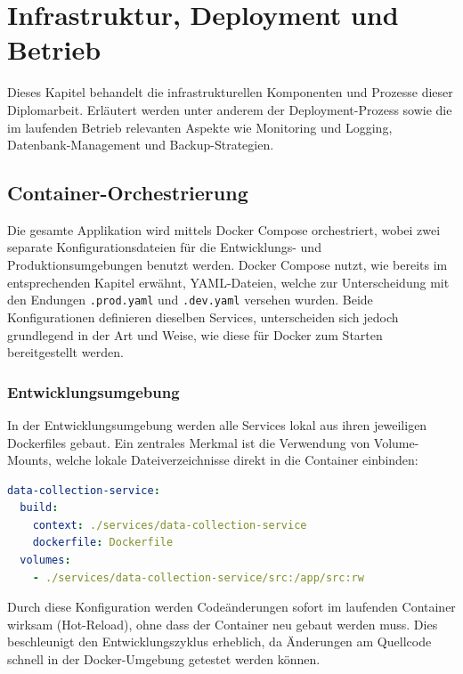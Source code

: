 \section{Infrastruktur, Deployment und Betrieb}
\label{sec:infrastruktur}

Dieses Kapitel behandelt die infrastrukturellen Komponenten und Prozesse dieser Diplomarbeit.
Erläutert werden unter anderem der Deployment-Prozess sowie die im laufenden Betrieb relevanten Aspekte wie Monitoring und Logging, Datenbank-Management und Backup-Strategien.


\subsection{Container-Orchestrierung}
\label{sec:container_orchestrierung}

Die gesamte Applikation wird mittels Docker Compose orchestriert, wobei zwei separate Konfigurationsdateien für die Entwicklungs- und Produktionsumgebungen benutzt werden.
Docker Compose nutzt, wie bereits im entsprechenden Kapitel erwähnt, YAML-Dateien, welche zur Unterscheidung mit den Endungen \texttt{.prod.yaml} und \texttt{.dev.yaml} versehen wurden.
Beide Konfigurationen definieren dieselben Services, unterscheiden sich jedoch grundlegend in der Art und Weise, wie diese für Docker zum Starten bereitgestellt werden.


\subsubsection{Entwicklungsumgebung}

In der Entwicklungsumgebung werden alle Services lokal aus ihren jeweiligen Dockerfiles gebaut.
Ein zentrales Merkmal ist die Verwendung von Volume-Mounts, welche lokale Dateiverzeichnisse direkt in die Container einbinden:

\begin{lstlisting}[language=yaml, caption={Volume Mount Entwicklungs-Compose-Konfiguration}, label={lst:compose_dev}]
data-collection-service:
  build:
    context: ./services/data-collection-service
    dockerfile: Dockerfile
  volumes:
    - ./services/data-collection-service/src:/app/src:rw
\end{lstlisting}

Durch diese Konfiguration werden Codeänderungen sofort im laufenden Container wirksam (Hot-Reload), ohne dass der Container neu gebaut werden muss.
Dies beschleunigt den Entwicklungszyklus erheblich, da Änderungen am Quellcode schnell in der Docker-Umgebung getestet werden können.

